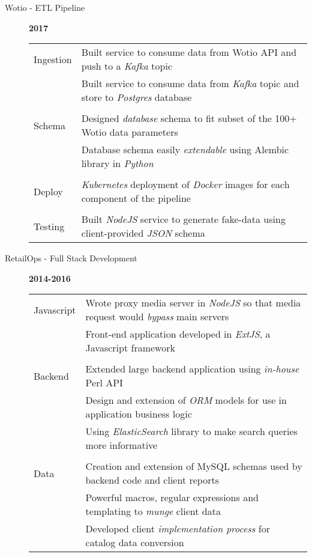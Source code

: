 \documentclass[12pt]{article}
\begin{document}
\begin{description}
\begin{description}
                \item[Wotio - ETL Pipeline] \hfill \textbf{2017}\\
                    \begin{tabular}{l|l}
                        Ingestion    & Built service to consume data from Wotio API and push to a \textit{Kafka} topic\\
                                  & Built service to consume data from \textit{Kafka} topic and store to \textit{Postgres} database\\
				\\[-1.7mm]
                        Schema   & Designed \textit{database} schema to fit subset of the 100+ Wotio data parameters\\
				  & Database schema easily \textit{extendable} using Alembic library in \textit{Python}\\
				\\[-1.7mm]
                        Deploy& \textit{Kubernetes} deployment of \textit{Docker} images for each component of the pipeline\\
				\\[-1.7mm]
                        Testing      & Built \textit{NodeJS} service to generate fake-data using client-provided \textit{JSON} schema\\
                    \end{tabular}

                \item[RetailOps - Full Stack Development] \hfill \textbf{2014-2016}\\
                    \begin{tabular}{l|l}
                        Javascript & Wrote proxy media server in \textit{NodeJS} so that media request would \textit{bypass} main servers \\
				   & Front-end application developed in \textit{ExtJS}, a Javascript framework\\
				\\[-1.7mm]
                        Backend    & Extended large backend application using \textit{in-house} Perl API \\
                                   & Design and extension of \textit{ORM} models for use in application business logic \\
                                   & Using \textit{ElasticSearch} library to make search queries more informative\\
				\\[-1.7mm]
                        Data       & Creation and extension of MySQL schemas used by backend code and client reports\\
                                   & Powerful macros, regular expressions and templating to \textit{munge} client data\\
                        	   & Developed client \textit{implementation process} for catalog data conversion\\
                    \end{tabular}
            \end{description}


\end{description}
\end{document}
